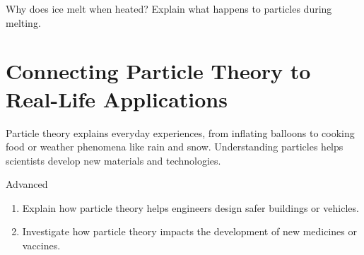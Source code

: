 \begin{stopandthink}
Why does ice melt when heated? Explain what happens to particles during melting.
\end{stopandthink}

\section{Connecting Particle Theory to Real-Life Applications}

Particle theory explains everyday experiences, from inflating balloons to cooking food or weather phenomena like rain and snow. Understanding particles helps scientists develop new materials and technologies.


\begin{tieredquestions}{Advanced}
\begin{enumerate}
    \item Explain how particle theory helps engineers design safer buildings or vehicles.
    \item Investigate how particle theory impacts the development of new medicines or vaccines.
\end{enumerate}
\end{tieredquestions}


\FloatBarrier %